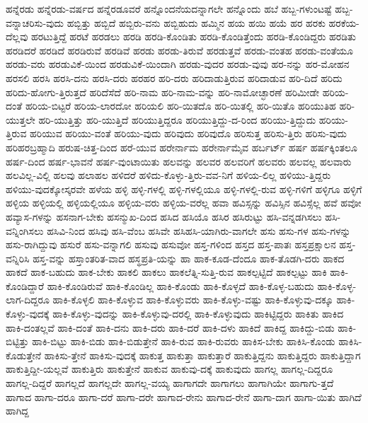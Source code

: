 {ಹನ್ನೆರಡು
ಹನ್ನೆರಡು-ವರ್ಷದ
ಹನ್ನೆರಡೂವರೆ
ಹನ್ನೊಂದನೆಯದನ್ನಾಗಲೇ
ಹನ್ನೊಂದು
ಹಬೆ
ಹಬ್ಬ-ಗಳುಂಟಷ್ಟೆ
ಹಬ್ಬ-ವನ್ನಾಚರಿಸು-ವುದು
ಹಬ್ಬಿತ್ತು
ಹಬ್ಬಿದೆ
ಹಬ್ಬಿರು-ವನು
ಹಬ್ಬಿಹುದು
ಹಮ್ಮಿನ
ಹಯ
ಹಯಿ
ಹಯೆ
ಹರ
ಹರಕು
ಹರಕೆಯ-ದೆಲ್ಲವು
ಹರಟುತ್ತಿದ್ದೆ
ಹರಟೆ
ಹರಡಲು
ಹರಡಿ
ಹರಡಿ-ಕೊಂಡಿತು
ಹರಡಿ-ಕೊಂಡಿತ್ತೆಂದು
ಹರಡಿ-ಕೊಂಡಿದ್ದರು
ಹರಡಿತು
ಹರಡಿದರೆ
ಹರಡಿದೆ
ಹರಡಿರುವೆ
ಹರಡಿವೆ
ಹರಡು
ಹರಡು-ತಿರುವೆ
ಹರಡುತ್ತವೆ
ಹರಡು-ವಂತಹ
ಹರಡು-ವಂತೆಯೂ
ಹರಡು-ವರು
ಹರಡುವಿಕೆ-ಯಿಂದ
ಹರಡುವಿಕೆ-ಯಿಂದಾಗಿ
ಹರಡು-ವುದರ
ಹರಡು-ವುವು
ಹರ-ನನ್ನು
ಹರ-ಮೋಹನ
ಹರಸಲಿ
ಹರಸಿ
ಹರಸಿ-ದನು
ಹರಸಿ-ದರು
ಹರಹರ
ಹರಿ-ದರು
ಹರಿದಾಡುತ್ತಿರುವ
ಹರಿದಾಡುವ
ಹರಿ-ದಿದೆ
ಹರಿದು
ಹರಿದು-ಹೋಗು-ತ್ತಿರುತ್ತದೆ
ಹರಿದೆಸೆದೆ
ಹರಿ-ನಾಮ
ಹರಿ-ನಾಮ-ವನ್ನು
ಹರಿ-ನಾಮೋಚ್ಛಾರಣೆ
ಹರಿಮೀಡೇ
ಹರಿಯ-ದಂತೆ
ಹರಿಯ-ಬಿಟ್ಟರೆ
ಹರಿಯ-ಲಾರದೋ
ಹರಿಯಲಿ
ಹರಿ-ಯಿತದೊ
ಹರಿ-ಯಿತಲ್ಲಿ
ಹರಿ-ಯಿತೊ
ಹರಿಯುತಿಹ
ಹರಿ-ಯುತ್ತಲೇ
ಹರಿ-ಯುತ್ತಿತ್ತು
ಹರಿ-ಯುತ್ತಿದೆ
ಹರಿಯುತ್ತಿದ್ದರೂ
ಹರಿಯುತ್ತಿದ್ದು-ದ-ರಿಂದ
ಹರಿಯು-ತ್ತಿದ್ದುದು
ಹರಿಯು-ತ್ತಿರುವ
ಹರಿಯುವ
ಹರಿಯು-ವಂತೆ
ಹರಿಯು-ವುದು
ಹರಿವುದು
ಹರಿವುದೊ
ಹರಿಸುತ್ತ
ಹರಿಸು-ತ್ತಿರು
ಹರಿಸು-ವುದು
ಹರಿಹರಬ್ರಹ್ಮಾದಿ
ಹರುಷ-ಚಿತ್ತ-ದಿಂದ
ಹರೆ-ಯುವ
ಹರೇರ್ನಾಮ
ಹರೇರ್ನಾಮೈವ
ಹರ್ಬರ್ಟ್
ಹರ್ಷ
ಹರ್ಷಕ್ಕಿಂತಲೂ
ಹರ್ಷ-ದಿಂದ
ಹರ್ಷ-ಭಾವನೆ
ಹರ್ಷ-ವುಂಟಾಯಿತು
ಹಲವನ್ನು
ಹಲವರ
ಹಲವರಿಗೆ
ಹಲವರು
ಹಲವಲ್ಲ
ಹಲವಾರು
ಹಲವಿಲ್ಲ-ವಿಲ್ಲಿ
ಹಲವು
ಹಲಾಹಲ
ಹಳಿದರೆ
ಹಳಿದು-ಕೊಳ್ಳು-ತ್ತಿರು-ವವ-ನಿಗೆ
ಹಳಿಯ-ಲಿಲ್ಲ
ಹಳಿಯು-ತ್ತಿದ್ದರು
ಹಳಿಯು-ವುದಕ್ಕೋಸ್ಕರವೇ
ಹಳೆಯ
ಹಳ್ಳಿ
ಹಳ್ಳಿ-ಗಳಲ್ಲಿ
ಹಳ್ಳಿ-ಗಳಲ್ಲಿಯೂ
ಹಳ್ಳಿ-ಗಳಲ್ಲಿ-ರುವ
ಹಳ್ಳಿ-ಗಳಿಗೆ
ಹಳ್ಳಿಗೂ
ಹಳ್ಳಿಗೆ
ಹಳ್ಳಿಯ
ಹಳ್ಳಿಯಲ್ಲಿ
ಹಳ್ಳಿಯಲ್ಲಿಯೂ
ಹಳ್ಳಿಯ-ವರು
ಹಳ್ಳಿಯ-ವರೆಲ್ಲ
ಹವಾ
ಹವಿಸ್ಸನ್ನು
ಹವಿಸ್ಸಿನ
ಹವಿಸ್ಸೆಲ್ಲ
ಹವೆ
ಹವೋ
ಹವ್ಯಾಸ-ಗಳನ್ನು
ಹಸನಾಗ-ಬೇಕು
ಹಸನ್ಮುಖ-ದಿಂದ
ಹಸಿದ
ಹಸಿಯೊ
ಹಸಿರ
ಹಸಿರುಟ್ಟು
ಹಸಿ-ವನ್ನಡಗಿಸಲು
ಹಸಿ-ವನ್ನಿಂಗಿಸಲು
ಹಸಿವಿ-ನಿಂದ
ಹಸಿವು
ಹಸಿ-ವೆಂಬ
ಹಸಿವೇ
ಹಸಿಹಸಿ-ಯಾಗಿರು-ವಾಗಲೇ
ಹಸು
ಹಸು-ಗಳ
ಹಸು-ಗಳನ್ನು
ಹಸು-ರಾಗಿದ್ದುವು
ಹಸುರೆ
ಹಸು-ವನ್ನಾಗಲಿ
ಹಸುವು
ಹಸುವೋ
ಹಸ್ತ-ಗಳಿಂದ
ಹಸ್ತದ
ಹಸ್ತ-ಪಾತಃ
ಹಸ್ತಪ್ರಕ್ಷಾಲನ
ಹಸ್ತ-ವನ್ನಿರಿಸಿ
ಹಸ್ತ-ವನ್ನು
ಹಸ್ತಾಂತರಿತ-ವಾದ
ಹಸ್ಥಪ್ರತಿ-ಯನ್ನು
ಹಾ
ಹಾಕ-ಕೂಡ-ದೆಂದೂ
ಹಾಕ-ತೊಡಗಿ-ದರು
ಹಾಕದ
ಹಾಕದೆ
ಹಾಕ-ಬಹುದು
ಹಾಕ-ಬೇಕು
ಹಾಕಲಿ
ಹಾಕಲು
ಹಾಕಲೆತ್ನಿ-ಸುತ್ತಿ-ರುವ
ಹಾಕಲ್ಪಟ್ಟಿದೆ
ಹಾಕಲ್ಪಟ್ಟು
ಹಾಕಿ
ಹಾಕಿ-ಕೊಂಡಿದ್ದಾರೆ
ಹಾಕಿ-ಕೊಂಡಿರುವೆ
ಹಾಕಿ-ಕೊಂಡಿಲ್ಲ
ಹಾಕಿ-ಕೊಂಡು
ಹಾಕಿ-ಕೊಳ್ಳದೆ
ಹಾಕಿ-ಕೊಳ್ಳ-ಬಹುದು
ಹಾಕಿ-ಕೊಳ್ಳ-ಲಾಗ-ದಿದ್ದರೂ
ಹಾಕಿ-ಕೊಳ್ಳಲಿ
ಹಾಕಿ-ಕೊಳ್ಳುವ
ಹಾಕಿ-ಕೊಳ್ಳುವರು
ಹಾಕಿ-ಕೊಳ್ಳು-ವಷ್ಟು
ಹಾಕಿ-ಕೊಳ್ಳುವು-ದಕ್ಕೂ
ಹಾಕಿ-ಕೊಳ್ಳು-ವುದಕ್ಕೆ
ಹಾಕಿ-ಕೊಳ್ಳು-ವುದನ್ನು
ಹಾಕಿ-ಕೊಳ್ಳುವು-ದರಲ್ಲಿ
ಹಾಕಿ-ಕೊಳ್ಳುವುದು
ಹಾಕಿಟ್ಟಿದ್ದರು
ಹಾಕಿತು
ಹಾಕಿದ
ಹಾಕಿ-ದಂತಲ್ಲವೆ
ಹಾಕಿ-ದಂತೆ
ಹಾಕಿ-ದನು
ಹಾಕಿ-ದರು
ಹಾಕಿ-ದರೆ
ಹಾಕಿ-ದಳು
ಹಾಕಿದೆ
ಹಾಕಿದ್ದ
ಹಾಕಿದ್ದು-ಬಿಡು
ಹಾಕಿ-ಬಿಟ್ಟಿತ್ತು
ಹಾಕಿ-ಬಿಟ್ಟು
ಹಾಕಿ-ಬಿಡು
ಹಾಕಿ-ಬಿಡುತ್ತೇನೆ
ಹಾಕಿ-ರುವ
ಹಾಕಿ-ರುವರು
ಹಾಕಿಸ-ಬೇಕು
ಹಾಕಿಸಿ-ಕೊಂಡು
ಹಾಕಿಸಿ-ಕೊಡುತ್ತೇನೆ
ಹಾಕಿಸು-ತ್ತೇನೆ
ಹಾಕಿಸು-ವುದಕ್ಕೆ
ಹಾಕುತ್ತ
ಹಾಕುತ್ತಾ
ಹಾಕುತ್ತಾರೆ
ಹಾಕುತ್ತಿದ್ದನು
ಹಾಕುತ್ತಿದ್ದರು
ಹಾಕುತ್ತಿದ್ದಾಗ
ಹಾಕುತ್ತಿದ್ದೀ-ಯಲ್ಲವೆ
ಹಾಕುತ್ತಿರು
ಹಾಕುತ್ತೇನೆ
ಹಾಕುವ
ಹಾಕುವು-ದಕ್ಕೆ
ಹಾಕುವುದು
ಹಾಗಲ್ಲ
ಹಾಗಲ್ಲ-ದಿದ್ದರೂ
ಹಾಗಲ್ಲ-ದಿದ್ದರೆ
ಹಾಗಲ್ಲದೆ
ಹಾಗಲ್ಲದೇ
ಹಾಗಲ್ಲ-ವಯ್ಯ
ಹಾಗಾಗದೇ
ಹಾಗಾಗಲು
ಹಾಗಾಗಿಯೇ
ಹಾಗಾಗು-ತ್ತದೆ
ಹಾಗಾದ
ಹಾಗಾ-ದರೂ
ಹಾಗಾ-ದರೆ
ಹಾಗಾ-ದರೇ
ಹಾಗಾದ-ರೇನು
ಹಾಗಾದ-ರೇನೆ
ಹಾಗಾ-ದಾಗ
ಹಾಗಾ-ಯಿತು
ಹಾಗಿದೆ
ಹಾಗಿದ್ದ
}
